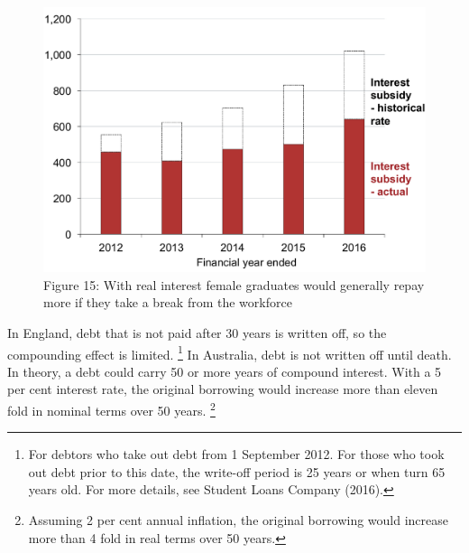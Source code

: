 \documentclass[embargoed]{grattan}
\begin{document}
\begin{figure}
\caption{Figure 15: With real interest female graduates would generally repay more if they take a break from the workforce}\label{fig:fig15-with-real-interest-female-grads-would-repay-more-if-they-took-break-from-workforce}


\includegraphics[page=15]{atlas/Chartpack.pdf}
\end{figure}


In England, debt that is not paid after 30 years is written off, so the compounding effect is limited.%
\footnote{For debtors who take out debt from 1 September 2012.
For those who took out debt prior to this date, the write-off period is 25 years or when turn 65 years old.
For more details, see Student Loans Company (2016).} In Australia, debt is not written off until death.
In theory, a debt could carry 50 or more years of compound interest.
With a 5 per cent interest rate, the original borrowing would increase more than eleven fold in nominal terms over 50 years.%
\footnote{Assuming 2 per cent annual inflation, the original borrowing would increase more than 4 fold in real terms over 50 years.}
\end{document}
